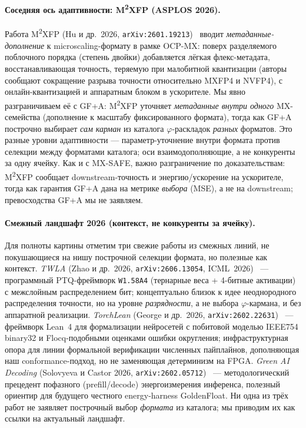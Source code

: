 \documentclass[11pt,a4paper]{article}
\theoremstyle{plain}
\begin{document}
\paragraph{Соседняя ось адаптивности: M\textsuperscript{2}XFP (ASPLOS 2026).}
Работа M\textsuperscript{2}XFP (Hu и др.\ 2026, \texttt{arXiv:2601.19213})~\cite{m2xfp2026}
вводит \emph{метаданные-дополнение} к microscaling-формату в рамке
OCP-MX: поверх разделяемого поблочного порядка (степень двойки)
добавляется лёгкая флекс-метадата, восстанавливающая точность,
теряемую при малобитной квантизации (авторы сообщают сокращение
разрыва точности относительно MXFP4 и NVFP4), с онлайн-квантизацией
и аппаратным блоком в ускорителе. Мы явно разграничиваем её с GF+A:
M\textsuperscript{2}XFP уточняет \emph{метаданные внутри одного}
MX-семейства (дополнение к масштабу фиксированного формата), тогда
как GF+A построчно выбирает \emph{сам карман} из каталога
\(\varphi\)-раскладок \emph{разных} форматов. Это разные уровни
адаптивности --- параметр-уточнение внутри формата против селекции
между форматами каталога; оси взаимодополняющие, а не конкуренты за
одну ячейку. Как и с MX-SAFE, важно разграничение по
доказательствам: M\textsuperscript{2}XFP сообщает downstream-точность
и энергию/ускорение на ускорителе, тогда как гарантия GF+A дана на
метрике \emph{выбора} (MSE), а не на downstream; превосходства GF+A
мы не заявляем.

\paragraph{Смежный ландшафт 2026 (контекст, не конкуренты за ячейку).}
Для полноты картины отметим три свежие работы из смежных линий, не
покушающиеся на нишу построчной селекции формата, но полезные как
контекст. \emph{TWLA} (Zhao и др.\ 2026, \texttt{arXiv:2606.13054},
ICML~2026)~\cite{twla2026} --- программный PTQ-фреймворк \texttt{W1.58A4}
(тернарные веса + 4-битные активации) с межслойным распределением
бит; концептуально близок к идее неоднородного распределения
точности, но на уровне \emph{разрядности}, а не выбора
\(\varphi\)-кармана, и без аппаратной реализации.
\emph{TorchLean} (George и др.\ 2026, \texttt{arXiv:2602.22631})~\cite{torchlean2026} ---
фреймворк Lean~4 для формализации нейросетей с побитовой моделью
IEEE754 binary32 и Flocq-подобными оценками ошибки округления;
инфраструктурная опора для линии формальной верификации численных
пайплайнов, дополняющая наш conformance-подход, но не заменяющая
детерминизм на FPGA. \emph{Green AI Decoding} (Solovyeva и
Castor 2026, \texttt{arXiv:2602.05712})~\cite{greenaidecoding2026} --- методологический
прецедент пофазного (prefill/decode) энергоизмерения инференса,
полезный ориентир для будущего честного energy-harness GoldenFloat.
Ни одна из трёх работ не заявляет построчный выбор \emph{формата}
из каталога; мы приводим их как ссылки на актуальный ландшафт.
\end{document}
